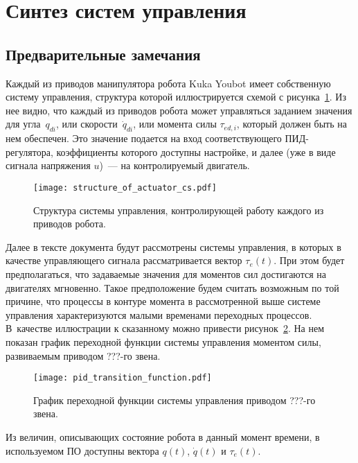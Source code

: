 \section{Синтез систем управления}\label{part_control_systems}
\subsection{Предварительные замечания}
Каждый из приводов манипулятора робота Kuka Youbot имеет собственную систему управления, структура которой иллюстрируется схемой с рисунка~\ref{img_structure_of_actuator_cs}.
Из нее видно, что каждый из приводов робота может управляться заданием значения для угла~$q_{di}$, или скорости~$\dot{q}_{di}$, или момента силы $\tau_{ed,i}$, который должен быть на нем обеспечен.
Это значение подается на вход соответствующего ПИД-регулятора, коэффициенты которого доступны настройке, и далее (уже в виде сигнала напряжения $u$)~--- на контролируемый двигатель.

\vspace{0.5cm}

\begin{figure}[h!]
	\centering\texttt{[image: structure\_of\_actuator\_cs.pdf]}
	\caption{Структура системы управления, контролирующей работу каждого из приводов робота.}
	\label{img_structure_of_actuator_cs}
\end{figure}

Далее в тексте документа будут рассмотрены системы управления, в которых в качестве управляющего сигнала рассматривается вектор $\tau_e(t)$.
При этом будет предполагаться, что задаваемые значения для моментов сил достигаются на двигателях мгновенно.
Такое предположение будем считать возможным по той причине, что процессы в контуре момента в рассмотренной выше системе управления характеризуются малыми временами переходных процессов.
В~качестве иллюстрации к сказанному можно привести рисунок~\ref{img_pid_transition_function}.
На нем показан график переходной функции системы управления моментом силы, развиваемым приводом ???-го звена.

\begin{figure}[h!]
	\centering\texttt{[image: pid\_transition\_function.pdf]}
	\caption{График переходной функции системы управления приводом ???-го звена.}
	\label{img_pid_transition_function}
\end{figure}

Из величин, описывающих состояние робота в данный момент времени, в используемом ПО доступны вектора $q(t)$, $\dot{q}(t)$ и $\tau_e(t)$.

\newpage
